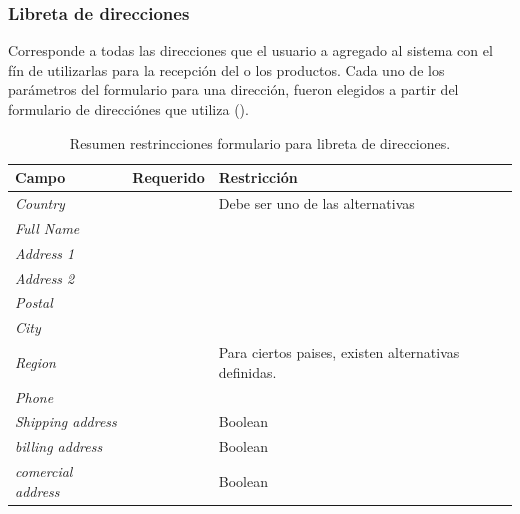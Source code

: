 \subsubsection{Libreta de direcciones}

Corresponde a todas las direcciones que el usuario a agregado al sistema con el fín de utilizarlas para la recepción del o los productos. Cada uno de los parámetros del formulario para una dirección, fueron elegidos a partir del formulario de direcciónes que utiliza \amazonNAME ().

\begin{table}[H]
    \centering
	\begin{tabular}{ |l|c||l| }
		\hline Campo & Requerido & Restricción \\ \hline
		\multirow{1}{*}{\textit{Country}} 			&  \checkmark 	&  Debe ser uno de las alternativas\\ \hline
		\multirow{1}{*}{\textit{Full Name}} 		&  \checkmark	& \\ \hline
		\multirow{1}{*}{\textit{Address 1}} 		&  \checkmark	& \\ \hline
		\multirow{1}{*}{\textit{Address 2}} 		&  				& \\ \hline
		\multirow{1}{*}{\textit{Postal}} 			&  \checkmark	& \\ \hline
		\multirow{1}{*}{\textit{City}} 				&  \checkmark	& \\ \hline
		\multirow{1}{*}{\textit{Region}} 			&  \checkmark	& Para ciertos paises, existen alternativas definidas.\\ \hline
		\multirow{1}{*}{\textit{Phone}} 			&  \checkmark	& \\ \hline
		\multirow{1}{*}{\textit{Shipping address}} 	&  \checkmark	& Boolean \\ \hline
		\multirow{1}{*}{\textit{billing address}} 	&  \checkmark	& Boolean \\ \hline
		\multirow{1}{*}{\textit{comercial address}} &  \checkmark	& Boolean \\ \hline
	\end{tabular}
 	\caption{Resumen restrincciones formulario para libreta de direcciones.}
    \label{tab:profile:form:restrictions:address}
\end{table}

